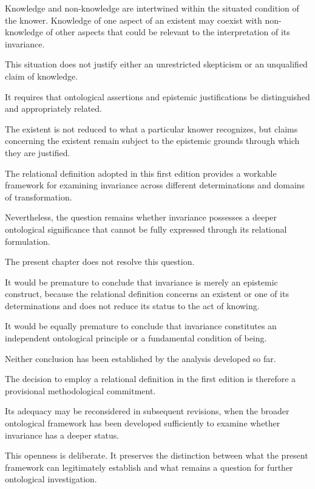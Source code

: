 Knowledge and non-knowledge are
intertwined within the situated condition
of the knower. Knowledge of one aspect
of an existent may coexist with
non-knowledge of other aspects that
could be relevant to the interpretation
of its invariance.

This situation does not justify either
an unrestricted skepticism or an
unqualified claim of knowledge.

It requires that ontological assertions
and epistemic justifications be
distinguished and appropriately
related.

The existent is not reduced to what
a particular knower recognizes, but
claims concerning the existent remain
subject to the epistemic grounds
through which they are justified.


The relational definition adopted in
this first edition provides a workable
framework for examining invariance
across different determinations and
domains of transformation.

Nevertheless, the question remains
whether invariance possesses a deeper
ontological significance that cannot
be fully expressed through its
relational formulation.

The present chapter does not resolve
this question.

It would be premature to conclude
that invariance is merely an epistemic
construct, because the relational
definition concerns an existent or
one of its determinations and does
not reduce its status to the act
of knowing.

It would be equally premature to
conclude that invariance constitutes
an independent ontological principle
or a fundamental condition of being.

Neither conclusion has been
established by the analysis developed
so far.

The decision to employ a relational
definition in the first edition
is therefore a provisional
methodological commitment.

Its adequacy may be reconsidered
in subsequent revisions, when
the broader ontological framework
has been developed sufficiently
to examine whether invariance
has a deeper status.

This openness is deliberate.
It preserves the distinction between
what the present framework can
legitimately establish and what
remains a question for further
ontological investigation.

